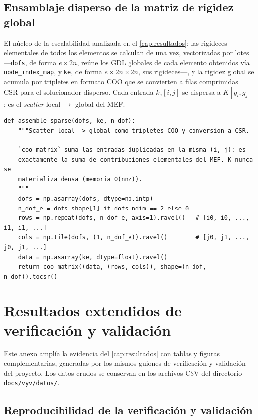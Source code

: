 \section{Ensamblaje disperso de la matriz de rigidez global}

El núcleo de la escalabilidad analizada en el \autoref{cap:resultados}: las rigideces elementales de todos los elementos se calculan de una vez, vectorizadas por lotes —\texttt{dofs}, de forma $e\times 2n$, reúne los GDL globales de cada elemento obtenidos vía \texttt{node\_index\_map}, y \texttt{ke}, de forma $e\times 2n\times 2n$, sus rigideces—, y la rigidez global se acumula por tripletes en formato COO que se convierten a filas comprimidas CSR para el solucionador disperso. Cada entrada $k_e[i,j]$ se dispersa a $K[g_i, g_j]$: es el \emph{scatter} local $\to$ global del MEF.

\begin{lstlisting}
def assemble_sparse(dofs, ke, n_dof):
    """Scatter local -> global como tripletes COO y conversion a CSR.

    `coo_matrix` suma las entradas duplicadas en la misma (i, j): es
    exactamente la suma de contribuciones elementales del MEF. K nunca se
    materializa densa (memoria O(nnz)).
    """
    dofs = np.asarray(dofs, dtype=np.intp)
    n_dof_e = dofs.shape[1] if dofs.ndim == 2 else 0
    rows = np.repeat(dofs, n_dof_e, axis=1).ravel()   # [i0, i0, ..., i1, i1, ...]
    cols = np.tile(dofs, (1, n_dof_e)).ravel()        # [j0, j1, ..., j0, j1, ...]
    data = np.asarray(ke, dtype=float).ravel()
    return coo_matrix((data, (rows, cols)), shape=(n_dof, n_dof)).tocsr()
\end{lstlisting}


\chapter{Resultados extendidos de verificación y validación}
\label{anexo:vyv}

Este anexo amplía la evidencia del \autoref{cap:resultados} con tablas y figuras complementarias, generadas por los mismos guiones de verificación y validación del proyecto. Los datos crudos se conservan en los archivos CSV del directorio \texttt{docs/vyv/datos/}.

\section{Reproducibilidad de la verificación y validación}
\label{sec:vyv-reproducibilidad}

